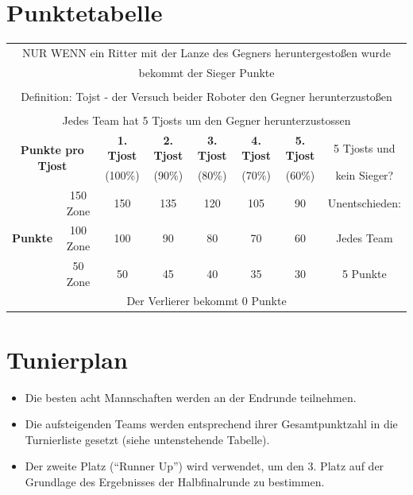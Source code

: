 \documentclass[a4paper,12pt]{article}
\begin{document}
\section{Punktetabelle}
\begin{center}
\begin{tabular}{|c|c|c|c|c|c|c|c|} \hline
	\multicolumn{8}{|c|}{NUR WENN ein Ritter mit der Lanze des Gegners heruntergestoßen wurde}\\
	\multicolumn{8}{|c|}{bekommt der Sieger Punkte}\\
	\multicolumn{8}{|c|}{}\\
	\multicolumn{8}{|c|}{Definition: Tojst - der Versuch beider Roboter den Gegner herunterzustoßen}\\
	\multicolumn{8}{|c|}{}\\
	\multicolumn{8}{|c|}{Jedes Team hat 5 Tjosts um den Gegner herunterzustossen} \\ \hline
	\multicolumn{2}{|c|}{\multirow{2}{*}{\textbf{Punkte pro Tjost}}} & \textbf{1. Tjost} & \textbf{2. Tjost} & \textbf{3. Tjost} & \textbf{4. Tjost} & \textbf{5. Tjost} & 5 Tjosts und \\
	\multicolumn{2}{|c|}{}  & (100\%) & (90\%) & (80\%) & (70\%) & (60\%) & kein Sieger? \\
	\cline{1-7}
	\multirow{3}{*}{\textbf{Punkte}} & 150 Zone & 150 & 135 & 120 & 105 & 90 & Unentschieden: \\
	\cline{2-7}
	& 100 Zone & 100 & 90 & 80 & 70 & 60 & Jedes Team \\
	\cline{2-7}
	& 50  Zone& 50 & 45 & 40 & 35 & 30 & 5 Punkte \\
	\hline
	\multicolumn{8}{|c|}{Der Verlierer bekommt 0 Punkte}\\
	\hline
\end{tabular}
\end{center}
\section{Tunierplan}
\begin{itemize}
        \item Die besten acht Mannschaften werden an der Endrunde teilnehmen.
        \item Die aufsteigenden Teams werden entsprechend ihrer Gesamtpunktzahl in die Turnierliste gesetzt (siehe untenstehende Tabelle).
        \item Der zweite Platz ("`Runner Up"') wird verwendet, um den 3. Platz auf der Grundlage des Ergebnisses der Halbfinalrunde zu bestimmen.
\end{itemize}
\begin{figure}[H]
    \centering
    \def\svgwidth{\columnwidth}
    
\end{figure}
\end{document}
